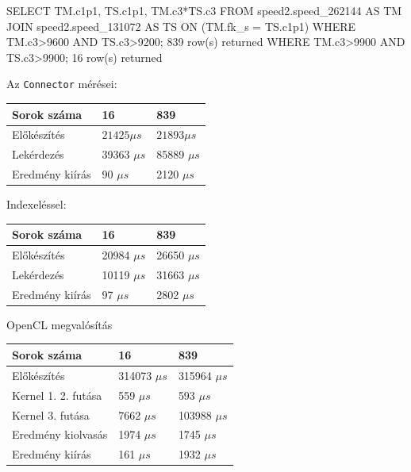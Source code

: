 
\begin{python}
SELECT TM.c1p1, TS.c1p1, TM.c3*TS.c3 FROM speed2.speed_262144 AS TM 
JOIN speed2.speed_131072 AS TS ON (TM.fk_s = TS.c1p1) 
WHERE TM.c3>9600 AND TS.c3>9200; 
	839 row(s) returned
WHERE TM.c3>9900 AND TS.c3>9900; 
	16 row(s) returned
\end{python}

Az \texttt{Connector} mérései:

\begin{table}[h!]
\centering
\begin{tabular}{|p{6cm}|p{3cm}|p{3cm}|}
\hline
Sorok száma & 16 & 839 \\
\hline\hline

Előkészítés & $21425 \mu s$ & $21893 \mu s$ \\
\hline

Lekérdezés & 39363 $\mu s$ & 85889 $\mu s$ \\
\hline

Eredmény kiírás & 90 $\mu s$ & 2120 $\mu s$ \\
\hline

\end{tabular}
\end{table}

Indexeléssel:

\begin{table}[h!]
\centering
\begin{tabular}{|p{6cm}|p{3cm}|p{3cm}|}
\hline
Sorok száma & 16 & 839 \\
\hline
\hline

Előkészítés & 20984 $\mu s$ & 26650 $\mu s$ \\
\hline

Lekérdezés & 10119 $\mu s$ & 31663 $\mu s$ \\
\hline

Eredmény kiírás & 97 $\mu s$ & 2802 $\mu s$ \\
\hline

\end{tabular}
\end{table}

OpenCL megvalósítás

\begin{table}[h!]
\centering
\begin{tabular}{|p{6cm}|p{3cm}|p{3cm}|}
\hline
Sorok száma & 16 & 839 \\
\hline
\hline
Előkészítés & 314073 $\mu s$ & 315964 $\mu s$ \\
\hline
Kernel 1. 2. futása & 559 $\mu s$ & 593 $\mu s$ \\
\hline
Kernel 3. futása & 7662 $\mu s$ & 103988 $\mu s$ \\
\hline
Eredmény kiolvasás & 1974 $\mu s$ & 1745 $\mu s$ \\
\hline
Eredmény kiírás & 161 $\mu s$ & 1932 $\mu s$ \\
\hline
\end{tabular}
\end{table}	

